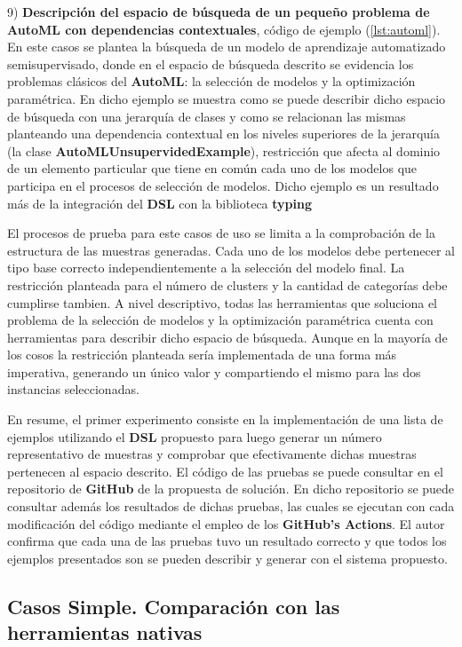 9) {\bf Descripción del espacio de búsqueda de un pequeño problema de AutoML con dependencias contextuales}, código de ejemplo (\ref{lst:automl}). En este casos se plantea la
búsqueda de un modelo de aprendizaje automatizado semisupervisado, donde en el espacio de búsqueda descrito se evidencia los
problemas clásicos del {\bf AutoML}: la selección de modelos y la optimización paramétrica. En dicho ejemplo se muestra como se puede
describir dicho espacio de búsqueda con una jerarquía de clases y como se relacionan las mismas planteando una dependencia contextual
en los niveles superiores de la jerarquía (la clase {\bf AutoMLUnsupervidedExample}), restricción que afecta al dominio de un elemento
particular que tiene en común cada uno de los modelos que participa en el procesos de selección de modelos. Dicho ejemplo es un
resultado más de la integración del {\bf DSL} con la biblioteca {\bf typing}

El procesos de prueba para este casos de uso se limita a la comprobación de la estructura de las muestras generadas. Cada uno de
los modelos debe pertenecer al tipo base correcto independientemente a la
selección del modelo final. La restricción planteada para el número de clusters y la cantidad de categorías debe cumplirse tambien.
A nivel descriptivo, todas las herramientas que soluciona el problema de la selección de modelos y la optimización paramétrica
cuenta con herramientas para describir dicho espacio de búsqueda. Aunque en la mayoría de los cosos la restricción planteada sería
implementada de una forma más imperativa, generando un único valor y compartiendo el mismo para las dos instancias seleccionadas.

En resume, el primer experimento consiste en la implementación de una lista de ejemplos utilizando el {\bf DSL} propuesto para luego generar
un número representativo de muestras y comprobar que efectivamente dichas muestras pertenecen al espacio descrito. El código de las
pruebas se puede consultar en el repositorio de {\bf GitHub} de la propuesta de solución. En dicho repositorio se puede consultar además los
resultados de dichas pruebas, las cuales se ejecutan con cada modificación del código mediante el empleo de los {\bf GitHub's Actions}.
El autor confirma que cada una de las pruebas tuvo un resultado correcto y que todos los ejemplos presentados son se pueden describir y
generar con el sistema propuesto.

\subsection{Casos Simple. Comparación con las herramientas nativas}



